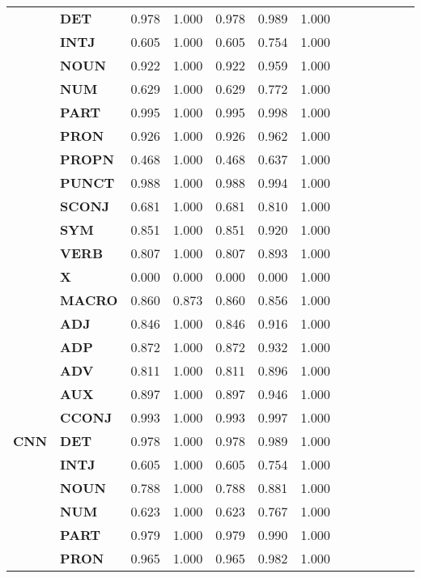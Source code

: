 \begin{longtable}{|l||l||l||l||l||l||l||l||l||l||l||l||l|}
\textbf{} & \textbf{DET} & 0.978 & 1.000 & 0.978 & 0.989 & 1.000 \\
\textbf{} & \textbf{INTJ} & 0.605 & 1.000 & 0.605 & 0.754 & 1.000 \\
\textbf{} & \textbf{NOUN} & 0.922 & 1.000 & 0.922 & 0.959 & 1.000 \\
\textbf{} & \textbf{NUM} & 0.629 & 1.000 & 0.629 & 0.772 & 1.000 \\
\textbf{} & \textbf{PART} & 0.995 & 1.000 & 0.995 & 0.998 & 1.000 \\
\textbf{} & \textbf{PRON} & 0.926 & 1.000 & 0.926 & 0.962 & 1.000 \\
\textbf{} & \textbf{PROPN} & 0.468 & 1.000 & 0.468 & 0.637 & 1.000 \\
\textbf{} & \textbf{PUNCT} & 0.988 & 1.000 & 0.988 & 0.994 & 1.000 \\
\textbf{} & \textbf{SCONJ} & 0.681 & 1.000 & 0.681 & 0.810 & 1.000 \\
\textbf{} & \textbf{SYM} & 0.851 & 1.000 & 0.851 & 0.920 & 1.000 \\
\textbf{} & \textbf{VERB} & 0.807 & 1.000 & 0.807 & 0.893 & 1.000 \\
\textbf{} & \textbf{X} & 0.000 & 0.000 & 0.000 & 0.000 & 1.000 \\
\textbf{} & \textbf{MACRO} & 0.860 & 0.873 & 0.860 & 0.856 & 1.000 \\
\cline{1-7}
\multirow[t]{18}{*}{\textbf{CNN}} & \textbf{ADJ} & 0.846 & 1.000 & 0.846 & 0.916 & 1.000 \\
\textbf{} & \textbf{ADP} & 0.872 & 1.000 & 0.872 & 0.932 & 1.000 \\
\textbf{} & \textbf{ADV} & 0.811 & 1.000 & 0.811 & 0.896 & 1.000 \\
\textbf{} & \textbf{AUX} & 0.897 & 1.000 & 0.897 & 0.946 & 1.000 \\
\textbf{} & \textbf{CCONJ} & 0.993 & 1.000 & 0.993 & 0.997 & 1.000 \\
\textbf{} & \textbf{DET} & 0.978 & 1.000 & 0.978 & 0.989 & 1.000 \\
\textbf{} & \textbf{INTJ} & 0.605 & 1.000 & 0.605 & 0.754 & 1.000 \\
\textbf{} & \textbf{NOUN} & 0.788 & 1.000 & 0.788 & 0.881 & 1.000 \\
\textbf{} & \textbf{NUM} & 0.623 & 1.000 & 0.623 & 0.767 & 1.000 \\
\textbf{} & \textbf{PART} & 0.979 & 1.000 & 0.979 & 0.990 & 1.000 \\
\textbf{} & \textbf{PRON} & 0.965 & 1.000 & 0.965 & 0.982 & 1.000 \\

\end{longtable}
